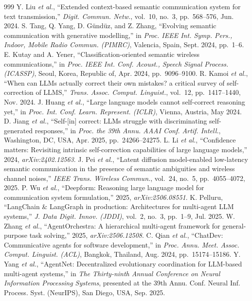 \begin{thebibliography}{999}
 Y. Liu \emph{et al.}, ``Extended context-based semantic communication system for text transmission,'' \emph{Digit. Commun. Netw.}, vol.~10, no.~3, pp.~568--576, Jun. 2024.
 S. Tang, Q. Yang, D. Gündüz, and Z. Zhang, ``Evolving semantic communication with generative modelling,'' in \emph{Proc. IEEE Int. Symp. Pers., Indoor, Mobile Radio Commun. (PIMRC)}, Valencia, Spain, Sept. 2024, pp.~1--6.
 E. Kutay and A. Yener, ``Classification-oriented semantic wireless communications,'' in \emph{Proc. IEEE Int. Conf. Acoust., Speech Signal Process. (ICASSP)}, Seoul, Korea, Republic of, Apr. 2024, pp.~9096--9100.
 R. Kamoi \emph{et al.}, ``When can LLMs actually correct their own mistakes? a critical survey of self-correction of LLMS,'' \emph{Trans. Assoc. Comput. Linguist.}, vol.~12, pp.~1417--1440, Nov. 2024.
 J. Huang \emph{et al.}, ``Large language models cannot self-correct reasoning yet,'' in \emph{Proc. Int. Conf. Learn. Represent. (ICLR)}, Vienna, Austria, May 2024.
 D. Jiang \emph{et al.}, ``Self-[in] correct: LLMs struggle with discriminating self-generated responses,'' in \emph{Proc. the 39th Annu. AAAI Conf. Artif. Intell.}, Washington, DC, USA, Apr. 2025, pp.~24266--24275.
 L. Li \emph{et al.}, ``Confidence matters: Revisiting intrinsic self-correction capabilities of large language models,'' 2024, \emph{arXiv:2402.12563}.
 J. Pei \emph{et al.}, ``Latent diffusion model-enabled low-latency semantic communication in the presence of semantic ambiguities and wireless channel noises,'' \emph{IEEE Trans. Wireless Commun.}, vol.~24, no.~5, pp.~4055--4072, 2025.
 P. Wu \emph{et al.}, ``Deepform: Reasoning large language model for communication system formulation,'' 2025, \emph{arXiv:2506.08551}.
 K. Pelluru, ``LangChain \& LangGraph in production: Architectures for multi-agent LLM systems,'' \emph{J. Data Digit. Innov. (JDDI)}, vol.~2, no.~3, pp.~1--9, Jul. 2025.
 W. Zhang \emph{et al.}, ``AgentOrchestra: A hierarchical multi-agent framework for general-purpose task solving,'' 2025, \emph{arXiv:2506.12508}.
 C. Qian \emph{et al.}, ``ChatDev: Communicative agents for software development,'' in \emph{Proc. Annu. Meet. Assoc. Comput. Linguist. (ACL)}, Bangkok, Thailand, Aug. 2024, pp.~15174--15186.
 Y. Yang \emph{et al.}, ``AgentNet: Decentralized evolutionary coordination for LLM-based multi-agent systems,'' in \emph{The Thirty-ninth Annual Conference on Neural Information Processing Systems}, presented at the 39th Annu. Conf. Neural Inf. Process. Syst. (NeurIPS), San Diego, USA, Sep. 2025.

\end{thebibliography}
